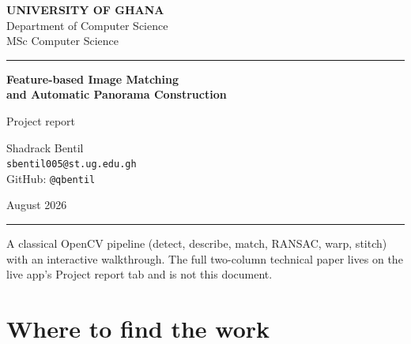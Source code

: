 \documentclass[11pt,a4paper]{article}
\begin{document}
\begin{titlepage}
\thispagestyle{empty}
\centering
\vspace*{2.4cm}

{\color{ugnavy}\large\bfseries\MakeUppercase{University of Ghana}}\\[0.35em]
{\large Department of Computer Science}\\[0.15em]
{\normalsize MSc Computer Science}

\vspace{1.1em}
{\color{ugnavy}\rule{0.62\textwidth}{1.4pt}}

\vspace{1.4em}
{\Large\bfseries\color{ugnavy} Feature-based Image Matching\\[0.25em]
and Automatic Panorama Construction}

\vspace{0.7em}
{\large Project report}

\vspace{1.8em}
{\large Shadrack Bentil}\\[0.35em]
{\normalsize\texttt{sbentil005@st.ug.edu.gh}}\\[0.2em]
{\normalsize GitHub: \texttt{@qbentil}}

\vspace{1.6em}
{\normalsize August 2026}

\vspace{1.8em}
{\color{ugnavy}\rule{0.62\textwidth}{1.4pt}}

\vspace{1.2em}
\begin{minipage}{0.82\textwidth}
\centering\normalsize\color{black!55}
A classical OpenCV pipeline (detect, describe, match, RANSAC, warp, stitch)
with an interactive walkthrough. The full two-column technical paper lives on
the live app's Project report tab and is not this document.
\end{minipage}

\vfill
\end{titlepage}
\setcounter{page}{1}

\section{Where to find the work}
\end{document}
